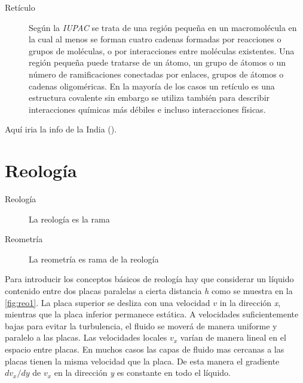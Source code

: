 
\begin{description}
    \item[Retículo] Según la \emph{IUPAC} \cite{IUPAC2} se trata de una región pequeña en un macromolécula en la cual al menos se forman cuatro cadenas formadas por reacciones o grupos de moléculas, o por interacciones entre moléculas existentes. Una región pequeña puede tratarse de un átomo, un grupo de átomos o un número de ramificaciones conectadas por enlaces, grupos de átomos o cadenas oligoméricas. En la mayoría de los casos un retículo es una estructura covalente sin embargo se utiliza también para describir interacciones químicas más débiles e incluso interacciones físicas.
\end{description}

Aquí iria la info de la India (\cite{NPTEL:Bio}).



\section{Reología}
\begin{description}
    \item[Reología] La reología es la rama
    \item[Reometría] La reometría es rama de la reología
\end{description}

Para introducir los conceptos básicos de reología hay que considerar un líquido contenido entre dos placas paralelas a cierta distancia \emph{h} como se muestra en la \autoref{fig:reo1}. La placa superior se desliza con una velocidad $v$ in la dirección \emph{x}, mientras que la placa inferior permanece estática. A velocidades suficientemente bajas para evitar la turbulencia, el fluido se moverá de manera uniforme y paralelo a las placas. Las velocidades locales $v_{x}$ varían de manera lineal en el espacio entre placas. En muchos casos las capas de fluido mas cercanas a las placas tienen la misma velocidad que la placa. De esta manera el gradiente $dv_{x}/{dy}$ de $v_{x}$ en la dirección \emph{y} es constante en todo el líquido.

